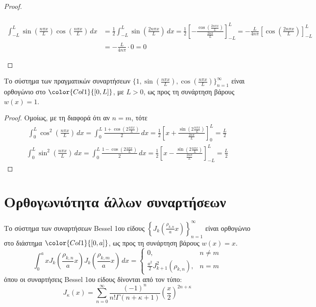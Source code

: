 \begin{proof}
\begin{myitemize}
\begin{align*}
      \end{align*}
      \begin{align*}
        \int _{-L}^{L} \sin{\left(\frac{n \pi x }{L}\right)} 
        \cos{\left(\frac{n \pi x}{L}\right)} \,{dx} 
            &= \frac{1}{2} \int _{-L}^{L} \sin{\left(\frac{2 n \pi x}{L}\right)} \,{dx} 
            = \frac{1}{2} \left[-\frac{\cos{\left(\frac{2 n \pi x}{L}\right)}}
            {\frac{2n \pi}{L}} \right]_{-L}^{L} 
            = -\frac{L}{4 n \pi} \left[\cos{\left(\frac{2n \pi x}{L}\right)} 
            \right]_{-L}^{L} \\
            &= -\frac{L}{4n\pi}\cdot 0 = 0
      \end{align*}
  \end{myitemize}
\end{proof}
\begin{prop}
  Το σύστημα των πραγματικών συναρτήσεων 
  $ \{ 1, \sin{\left(\frac{n \pi x}{L}\right)}, 
  \cos{\left(\frac{n \pi x}{L}\right)} \}_{n=1}^{\infty} $ 
  είναι ορθογώνιο στο $ \color{Col1}{[0,L]} $, με $ L>0 $, ως προς τη συνάρτηση βάρους 
  $ w(x)=1 $.
\end{prop}
\begin{proof}
  Ομοίως, με τη διαφορά ότι αν $ n=m $, τότε 
  \begin{align*}
    \int _{0}^{L} \cos^{2}\left(\frac{n \pi x}{L}\right) \,{dx} = 
    \int _{0}^{L} \frac{1+ \cos{\left( 2 \frac{n \pi x}{L} \right)}}{2}
    \,{dx} = 
    \frac{1}{2} \left[x + \frac{\sin{\left(2 \frac{n \pi x}{L}\right)}}
    {\frac{2 n \pi}{L}} \right]_{0}^{L} = \frac{L}{2}
  \end{align*}
  \begin{align*}
    \int _{0}^{L} \sin^{2}\left(\frac{n \pi x}{L}\right) \,{dx} = 
    \int _{0}^{L} \frac{1- \cos{\left( 2 \frac{n \pi x}{L} \right)}}{2}
    \,{dx} = 
    \frac{1}{2} \left[x - \frac{\sin{\left(2 \frac{n \pi x}{L}\right)}}
    {\frac{2 n \pi}{L}} \right]_{-L}^{L} = \frac{L}{2}
  \end{align*}
\end{proof}

\section*{Ορθογωνιότητα άλλων συναρτήσεων}

\begin{prop}
  Το σύστημα των συναρτήσεων \textcolor{Col1}{Bessel 1ου είδους}
  $ \left\{ J_{k}\left(\frac{\rho _{k,n}}{a}x \right)\right\}_{n=1}^{\infty} $ 
  είναι ορθογώνιο στο διάστημα $ \color{Col1}{[0,a]} $, ως προς τη συνάρτηση βάρους 
  $ w(x)=x $.
  \[
    \int _{0}^{a} x J_{k}\left(\frac{\rho _{k,n}}{a}x \right)
    J_{k}\left(\frac{\rho_{k,m}}{a}x\right) \,{dx} = 
    \begin{cases}
      0, & n \neq m \\
      \frac{a^{2}}{2} J_{k+1}^{2}(\rho_{k,n}), & n=m
    \end{cases}
   \] 
  όπου οι συναρτήσεις Bessel 1ου είδους δίνονται από τον τύπο:
  \[
    J_{\kappa}(x) = \sum_{n=0}^{\infty} \frac{(-1)^{n}}{n!
    \Gamma(n+\kappa+1)}\left(\frac{x}{2}\right)^{2n+\kappa} 
  \]
\end{prop}

